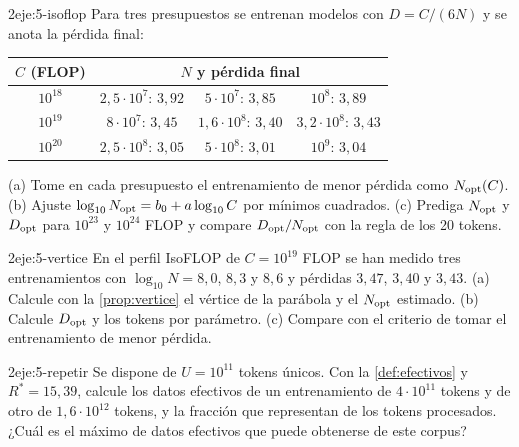\begin{ejercicio}{2}{eje:5-isoflop}
Para tres presupuestos se entrenan modelos con $D=C/(6N)$ y se anota la pérdida final:
\begin{center}\small
\begin{tabular}{@{}cccc@{}}
\toprule
$C$ (FLOP) & \multicolumn{3}{c}{$N$ y pérdida final} \\
\midrule
$10^{18}$ & $2{,}5\cdot 10^{7}$: $3{,}92$ & $5\cdot 10^{7}$: $3{,}85$ & $10^{8}$: $3{,}89$ \\
$10^{19}$ & $8\cdot 10^{7}$: $3{,}45$ & $1{,}6\cdot 10^{8}$: $3{,}40$ & $3{,}2\cdot 10^{8}$: $3{,}43$ \\
$10^{20}$ & $2{,}5\cdot 10^{8}$: $3{,}05$ & $5\cdot 10^{8}$: $3{,}01$ & $10^{9}$: $3{,}04$ \\
\bottomrule
\end{tabular}
\end{center}
(a) Tome en cada presupuesto el entrenamiento de menor pérdida como $N_{\mathrm{opt}}(C)$. (b) Ajuste $\log_{10}N_{\mathrm{opt}}=b_0+a\log_{10}C$ por mínimos cuadrados. (c) Prediga $N_{\mathrm{opt}}$ y $D_{\mathrm{opt}}$ para $10^{23}$ y $10^{24}$ FLOP y compare $D_{\mathrm{opt}}/N_{\mathrm{opt}}$ con la regla de los 20 tokens.
\end{ejercicio}

\begin{ejercicio}{2}{eje:5-vertice}
En el perfil IsoFLOP de $C=10^{19}$ FLOP se han medido tres entrenamientos con $\log_{10}N=8{,}0$, $8{,}3$ y $8{,}6$ y pérdidas $3{,}47$, $3{,}40$ y $3{,}43$. (a) Calcule con la \cref{prop:vertice} el vértice de la parábola y el $N_{\mathrm{opt}}$ estimado. (b) Calcule $D_{\mathrm{opt}}$ y los tokens por parámetro. (c) Compare con el criterio de tomar el entrenamiento de menor pérdida.
\end{ejercicio}

\begin{ejercicio}{2}{eje:5-repetir}
Se dispone de $U=10^{11}$ tokens únicos. Con la \cref{def:efectivos} y $R^{*}=15{,}39$, calcule los datos efectivos de un entrenamiento de $4\cdot 10^{11}$ tokens y de otro de $1{,}6\cdot 10^{12}$ tokens, y la fracción que representan de los tokens procesados. ¿Cuál es el máximo de datos efectivos que puede obtenerse de este corpus?
\end{ejercicio}

